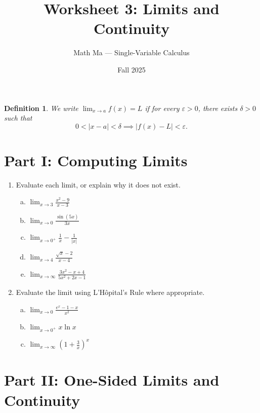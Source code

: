 \documentclass[11pt]{article}
\title{Worksheet 3: Limits and Continuity}
\author{Math Ma --- Single-Variable Calculus}
\date{Fall 2025}
\newtheorem*{definition*}{Definition}
\begin{document}
\maketitle

\begin{definition*}
We write $\displaystyle \lim_{x \to a} f(x) = L$ if for every $\varepsilon > 0$, there exists $\delta > 0$ such that
\[
  0 < |x - a| < \delta \implies |f(x) - L| < \varepsilon.
\]
\end{definition*}

\section*{Part I: Computing Limits}

\begin{enumerate}
\item Evaluate each limit, or explain why it does not exist.
\begin{enumerate}[(a)]
  \item $\displaystyle \lim_{x \to 3} \frac{x^2 - 9}{x - 3}$

  \item $\displaystyle \lim_{x \to 0} \frac{\sin(5x)}{3x}$

  \item $\displaystyle \lim_{x \to 0^+} \frac{1}{x} - \frac{1}{|x|}$

  \item $\displaystyle \lim_{x \to 4} \frac{\sqrt{x} - 2}{x - 4}$

  \item $\displaystyle \lim_{x \to \infty} \frac{3x^2 - x + 4}{5x^2 + 2x - 1}$
\end{enumerate}

\item Evaluate the limit using L'H\^{o}pital's Rule where appropriate.
\begin{enumerate}[(a)]
  \item $\displaystyle \lim_{x \to 0} \frac{e^x - 1 - x}{x^2}$

  \item $\displaystyle \lim_{x \to 0^+} x \ln x$

  \item $\displaystyle \lim_{x \to \infty} \left(1 + \frac{3}{x}\right)^x$
\end{enumerate}
\end{enumerate}

\section*{Part II: One-Sided Limits and Continuity}
\end{document}
